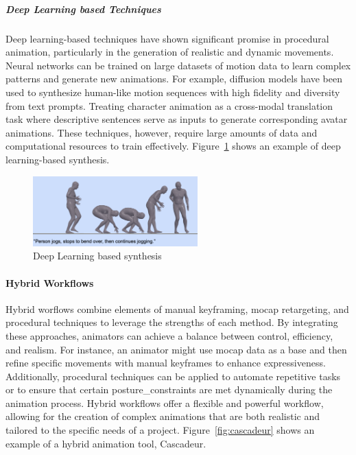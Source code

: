 \documentclass[../../main.tex]{subfiles}
\begin{document}
\subparagraph{Deep Learning based Techniques}
\label{ch:background_work:sign_language_synthesis:3d_techniques:avatar_animation:procedural_techniques:deep_learning_based_techniques}

Deep learning-based techniques have shown significant promise in procedural animation, particularly in the generation of realistic and dynamic movements. Neural networks can be trained on large datasets of motion data to learn complex patterns and generate new animations. For example, diffusion models have been used to synthesize human-like motion sequences with high fidelity and diversity from text prompts. Treating character animation as a cross-modal translation task where descriptive sentences serve as inputs to generate corresponding avatar animations. These techniques, however, require large amounts of data and computational resources to train effectively. Figure~\ref{fig:deep_learning_synthesis} shows an example of deep learning-based synthesis.

\begin{figure} 
  \centering \includegraphics[width = 2.5in]{chapters/background_work/images/deep_learning_synthesis.png} 
  \caption{Deep Learning based synthesis} 
  \label{fig:deep_learning_synthesis} 
\end{figure}

\paragraph{Hybrid Workflows}
\label{ch:background_work:sign_language_synthesis:3d_techniques:avatar_animation:hybrid_workflows}

Hybrid worflows combine elements of manual keyframing, mocap retargeting, and procedural techniques to leverage the strengths of each method. By integrating these approaches, animators can achieve a balance between control, efficiency, and realism. For instance, an animator might use mocap data as a base and then refine specific movements with manual keyframes to enhance expressiveness. Additionally, procedural techniques can be applied to automate repetitive tasks or to ensure that certain \gls{posture_constraint}s are met dynamically during the animation process. Hybrid workflows offer a flexible and powerful workflow, allowing for the creation of complex animations that are both realistic and tailored to the specific needs of a project. Figure~\ref{fig:cascadeur} shows an example of a hybrid animation tool, Cascadeur.
\end{document}
